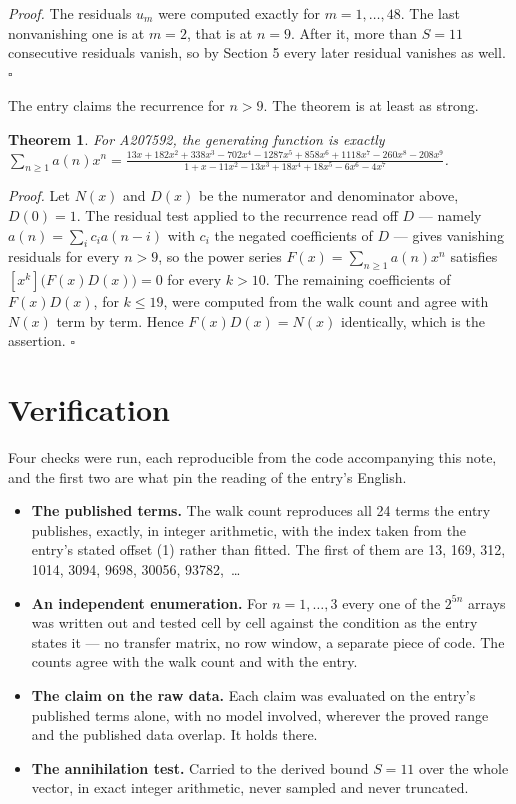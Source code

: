 \documentclass[11pt]{article}
\newtheorem{theorem}{Theorem}
\theoremstyle{definition}
\begin{document}
{\itshape Proof.} The residuals $u_m$ were computed exactly for $m = 1,\dots,48$. The last nonvanishing one is at $m = 2$, that is at $n = 9$. After it, more than $S = 11$ consecutive residuals vanish, so by Section 5 every later residual vanishes as well. $\square$

The entry claims the recurrence for $n > 9$. The theorem is at least as strong.

\begin{theorem} For A207592, the generating function is exactly $\sum_{n\ge 1} a(n)x^n = \frac{13x + 182x^{2} + 338x^{3} - 702x^{4} - 1287x^{5} + 858x^{6} + 1118x^{7} - 260x^{8} - 208x^{9}}{1 + x - 11x^{2} - 13x^{3} + 18x^{4} + 18x^{5} - 6x^{6} - 4x^{7}}$.\end{theorem}

{\itshape Proof.} Let $N(x)$ and $D(x)$ be the numerator and denominator above, $D(0)=1$. The residual test applied to the recurrence read off $D$ --- namely $a(n) = \sum_i c_i a(n-i)$ with $c_i$ the negated coefficients of $D$ --- gives vanishing residuals for every $n > 9$, so the power series $F(x)=\sum_{n\ge 1}a(n)x^n$ satisfies $[x^k]\bigl(F(x)D(x)\bigr) = 0$ for every $k > 10$. The remaining coefficients of $F(x)D(x)$, for $k \le 19$, were computed from the walk count and agree with $N(x)$ term by term. Hence $F(x)D(x) = N(x)$ identically, which is the assertion. $\square$

\section{Verification}

Four checks were run, each reproducible from the code accompanying this note, and the first two are what pin the reading of the entry's English.

\begin{itemize}

\item {\bfseries The published terms.} The walk count reproduces all 24 terms the entry publishes, exactly, in integer arithmetic, with the index taken from the entry's stated offset (1) rather than fitted. The first of them are 13, 169, 312, 1014, 3094, 9698, 30056, 93782,~\dots

\item {\bfseries An independent enumeration.} For $n = 1,\dots,3$ every one of the $2^{5n}$ arrays was written out and tested cell by cell against the condition as the entry states it --- no transfer matrix, no row window, a separate piece of code. The counts agree with the walk count and with the entry.

\item {\bfseries The claim on the raw data.} Each claim was evaluated on the entry's published terms alone, with no model involved, wherever the proved range and the published data overlap. It holds there.

\item {\bfseries The annihilation test.} Carried to the derived bound $S = 11$ over the whole vector, in exact integer arithmetic, never sampled and never truncated.

\end{itemize}
\end{document}
